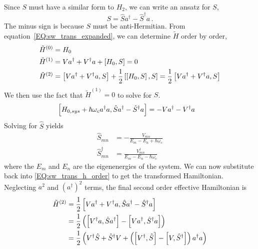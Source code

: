 Since $S$ must have a similar form to $H_2$, we can write an ansatz for $S$,
\begin{equation}
    S = \hat{S}a^\dagger - \hat{S}^\dagger a \,.
\end{equation}
The minus sign is because $S$ must be anti-Hermitian.
From equation~\ref{EQ:sw_trans_expanded}, we can determine $\tilde{H}$ order by order,
\begin{align}
    \tilde{H}^{(0)} & = H_0                                                                                                                                                             \\
    \tilde{H}^{(1)} & = Va^\dagger + V^\dagger a + \left[H_0,S\right] = 0                                                                                                                 \\
    \tilde{H}^{(2)} & = \left[Va^\dagger + V^\dagger a,S\right] + \frac{1}{2}\left[\left[H_0,S\right],S\right] = \frac{1}{2}\left[Va^\dagger + V^\dagger a,S\right] \label{EQ:sw_trans_h_order}
\end{align}
We then use the fact that $\tilde{H}^{(1)}=0$ to solve for $S$.
\begin{align*}
    \left[H_{0,sys}+\hbar \omega_c a^\dagger a,\hat{S}a^\dagger - \hat{S}^\dagger a\right] & = -Va^\dagger - V^\dagger a
\end{align*}
Solving for $\hat{S}$ yields
\begin{align}
    \hat{S}_{mn}         & = -\frac{V_{mn}}{E_m-E_n+\hbar\omega_c}         \\
    \hat{S}^\dagger_{mn} & = \frac{V^\dagger_{mn}}{E_m-E_n-\hbar \omega_c}
\end{align}
where the $E_m$ and $E_n$ are the eigenenergies of the system. We can now substitute back into \ref{EQ:sw_trans_h_order} to get the transformed Hamiltonian. Neglecting $a^2$ and $(a^\dagger)^2$ terms, the final second order effective Hamiltonian is
\begin{align}
    \tilde{H}^{(2)} & = \frac{1}{2}\left[Va^\dagger + V^\dagger a,\hat{S}a^\dagger - \hat{S}^\dagger a\right]                                                     \nonumber \\
                    & = \frac{1}{2}\left(\left[ V^\dagger a,\hat{S}a^\dagger \right]-\left[Va^\dagger ,\hat{S}^\dagger a\right]\right)\nonumber                     \nonumber \\
                    & = \frac{1}{2}\left(V^\dagger\hat{S}+\hat{S}^\dagger V+\left(\left[ V^\dagger ,\hat{S}\right]-\left[V,\hat{S}^\dagger\right]\right)a^\dagger a\right)
\end{align}
